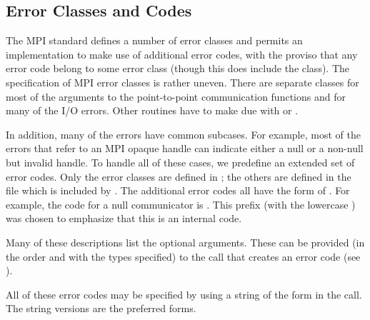 %
\subsection{Error Classes and Codes}
The MPI standard defines a number of error classes and permits an
implementation to make use of additional error codes, with the proviso that
any error code belong to some error class (though this does include the
 class).  
The specification of MPI error classes is rather uneven.  There are separate
classes for most of the arguments to the point-to-point communication
functions and for many of the I/O errors.  Other routines have to make due
with  or .

In addition, many of the errors have common subcases.  For example, most of
the errors that refer to an MPI opaque handle can indicate either a null or a
non-null but invalid handle.   To handle all of these cases, we predefine an
extended set of error codes.  Only the error classes are defined in
; the others are defined in the file  which is
included by .  The additional error
codes all have the form of .  For example,
the code for a null communicator is .
This prefix (with the lowercase ) was chosen to emphasize that this is
an internal code.


Many of these descriptions list the optional arguments.  These can be provided
(in the order and with the types specified) to the call that creates an error
code (see ). 

All of these error codes may be specified by using a string of the
form  in the  call.  The
string versions are the preferred forms.

